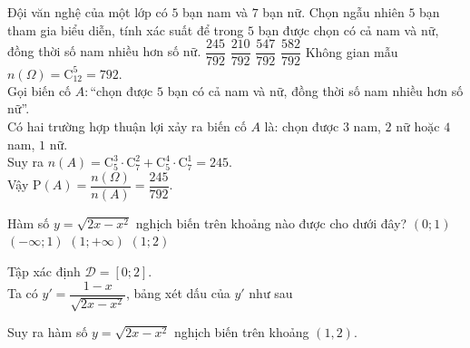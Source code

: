 \begin{ex}%
	Đội văn nghệ của một lớp có $5$ bạn nam và $7$ bạn nữ. Chọn ngẫu nhiên $5$ bạn tham gia biểu diễn, tính xác suất để trong $5$ bạn được chọn có cả nam và nữ, đồng thời số nam nhiều hơn số nữ.
	\choice
	{\True $\dfrac{245}{792}$}
	{$\dfrac{210}{792}$}
	{$\dfrac{547}{792}$}
	{$\dfrac{582}{792}$}
	\loigiai
	{
		Không gian mẫu $n(\Omega)=\mathrm{C}_{12}^5=792.$\\
		Gọi biến cố $A\colon$``chọn được $5$ bạn có cả nam và nữ, đồng thời số nam nhiều hơn số nữ''.\\
		Có hai trường hợp thuận lợi xảy ra biến cố $A$ là: chọn được $3$ nam, $2$ nữ hoặc $4$ nam, $1$ nữ.\\
		Suy ra $n(A)=\mathrm{C}_5^3\cdot\mathrm{C}_7^2+\mathrm{C}_5^4\cdot\mathrm{C}_7^1=245$.\\
		Vậy $\mathrm{P}(A)=\dfrac{n(\Omega)}{n(A)}=\dfrac{245}{792}$.
	}
\end{ex}
\begin{ex}%
	Hàm số $y=\sqrt{2x-x^2}$ nghịch biến trên khoảng nào được cho dưới đây?
	\choice
	{$(0;1)$}
	{$(-\infty;1)$}
	{$(1;+\infty)$}
	{\True $(1;2)$}
	\loigiai
	{
		Tập xác định $\mathscr{D}=[0;2]$.\\
		Ta có $y'=\dfrac{1-x}{\sqrt{2x-x^2}}$, bảng xét dấu của $y'$ như sau
		\begin{center}
		\end{center}
	Suy ra hàm số $y=\sqrt{2x-x^2}$ nghịch biến trên khoảng $(1,2)$.
	}
\end{ex}

